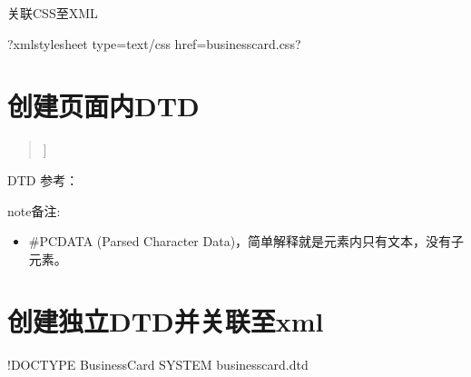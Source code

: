 \documentclass[letterpaper,10pt,english]{sphinxmanual}
\begin{document}
\sphinxAtStartPar
关联CSS至XML

\begin{sphinxVerbatim}[commandchars=\\\{\}]
\PYGZlt{}?xml\PYGZhy{}stylesheet type=\PYGZdq{}text/css\PYGZdq{} href=\PYGZdq{}businesscard.css\PYGZdq{}?\PYGZgt{}
\end{sphinxVerbatim}


\section{创建页面内DTD}
\label{\detokenize{XML/xml:dtd}}\begin{quote}

\begin{sphinxVerbatim}[commandchars=\\\{\}]
\PYG{c+cp}{\PYGZlt{}!DOCTYPE BusinessCard [}


]\PYGZgt{}
\end{sphinxVerbatim}
\end{quote}

\sphinxAtStartPar
DTD 参考：

\begin{sphinxadmonition}{note}{备注:}\begin{itemize}
\item {} 
\sphinxAtStartPar
\#PCDATA (Parsed Character Data)，简单解释就是元素内只有文本，没有子元素。

\end{itemize}
\end{sphinxadmonition}


\section{创建独立DTD并关联至xml}
\label{\detokenize{XML/xml:dtdxml}}
\begin{sphinxVerbatim}[commandchars=\\\{\}]
\PYGZlt{}!DOCTYPE BusinessCard SYSTEM \PYGZdq{}businesscard.dtd\PYGZdq{}\PYGZgt{}
\end{sphinxVerbatim}
\end{document}
